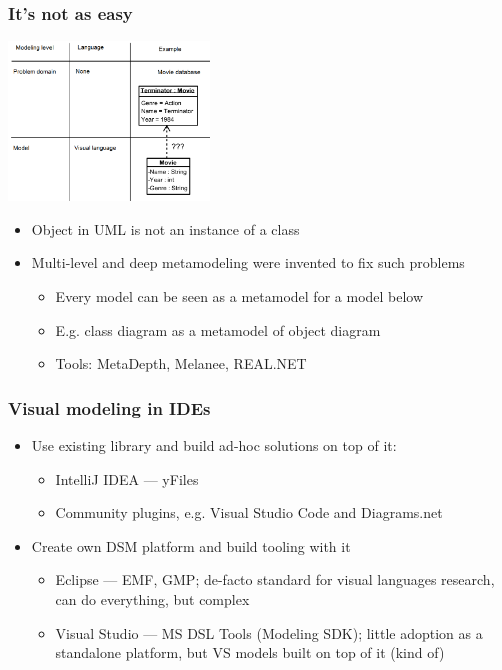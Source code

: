 \documentclass{slides-style}
\begin{document}
    \begin{frame}
        \frametitle{It's not as easy}
        \begin{center}
            \includegraphics[width=0.4\textwidth]{terminator-en.png}
        \end{center}
        \begin{itemize}
            \item Object in UML is not an instance of a class
            \item Multi-level and deep metamodeling were invented to fix such problems
            \begin{itemize}
                \item Every model can be seen as a metamodel for a model below
                \item E.g. class diagram as a metamodel of object diagram
                \item Tools: MetaDepth, Melanee, REAL.NET
            \end{itemize}
        \end{itemize}
    \end{frame}

    \begin{frame}
        \frametitle{Visual modeling in IDEs}
        \begin{itemize}
            \item Use existing library and build ad-hoc solutions on top of it:
            \begin{itemize}
                \item IntelliJ IDEA --- yFiles
                \item Community plugins, e.g. Visual Studio Code and Diagrams.net
            \end{itemize}
            \item Create own DSM platform and build tooling with it
            \begin{itemize}
                \item Eclipse --- EMF, GMP; de-facto standard for visual languages research, can do everything, but complex 
                \item Visual Studio --- MS DSL Tools (Modeling SDK); little adoption as a standalone platform, but VS models built on top of it (kind of)
            \end{itemize}
        \end{itemize}
    \end{frame}
\end{document}

